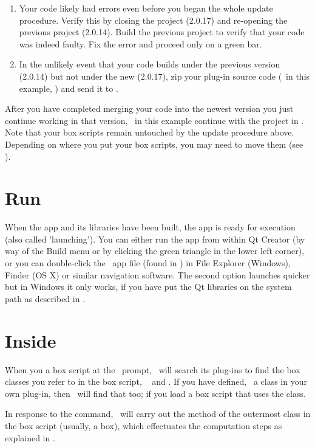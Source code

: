 \begin{enumerate}
\begin{enumerate}
\item Your code likely had errors even before you began the whole update procedure. Verify this by closing the project (2.0.17) and re-opening the previous project (2.0.14). Build the previous project to verify that your code was indeed faulty. Fix the error and proceed only on a green bar.
\item In the unlikely event that your code builds under the previous version (2.0.14) but not under the new (2.0.17), zip your plug-in source code (\ie\ in this example, ) and send it to \USS.
\end{enumerate}
\end{enumerate}

After you have completed merging your code into the newest version you just continue working in that version, \ie\ in this example continue with the project in . Note that your box scripts remain untouched by the update procedure above. Depending on where you put your box scripts, you may need to move them (see ).

\section{Run \protect\US}
When the app and its libraries have been built, the app is ready for execution (also called 'launching'). You can either run the app from within Qt Creator (by way of the Build menu or by clicking the green triangle in the lower left corner), or you can double-click the \US\ app file (found in ) in File Explorer (Windows), Finder (OS X) or similar navigation software. The second option launches quicker but in Windows it only works, if you have put the Qt libraries on the system path as described in .

\section{Inside \protect\US}
When you  a box script at the \US\ prompt, \US\ will search its plug-ins to find the box classes you refer to in the box script, \eg\  and . If you have defined, \eg\ a  class in your own plug-in, then \US\ will find that too; if you load a box script that uses the  class.

In response to the  command, \US\ will carry out the  method of the outermost class in the box script (usually, a  box), which effectuates the computation steps as explained in .

